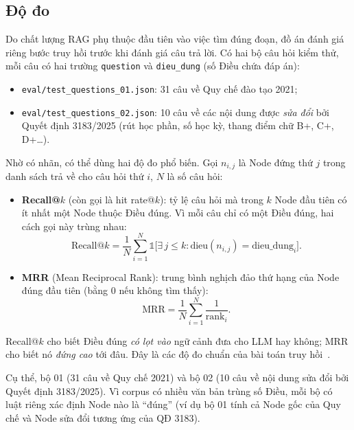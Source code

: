 \subsection{Độ đo}

Do chất lượng RAG phụ thuộc đầu tiên vào việc tìm đúng đoạn, đồ án đánh giá riêng bước truy hồi trước khi đánh giá câu trả lời. Có hai bộ câu hỏi kiểm thử, mỗi câu có hai trường \texttt{question} và \texttt{dieu\_dung} (số Điều chứa đáp án):

\begin{itemize}
  \item \texttt{eval/test\_questions\_01.json}: 31 câu về Quy chế đào tạo 2021;
  \item \texttt{eval/test\_questions\_02.json}: 10 câu về các nội dung được \emph{sửa đổi} bởi Quyết định 3183/2025 (rút học phần, số học kỳ, thang điểm chữ B+, C+, D+\ldots).
\end{itemize}

Nhờ có nhãn, có thể dùng hai độ đo phổ biến. Gọi $n_{i,j}$ là Node đứng thứ $j$ trong danh sách trả về cho câu hỏi thứ $i$, $N$ là số câu hỏi:

\begin{itemize}
  \item \textbf{Recall@$k$} (còn gọi là hit rate@$k$): tỷ lệ câu hỏi mà trong $k$ Node đầu tiên có ít nhất một Node thuộc Điều đúng. Vì mỗi câu chỉ có một Điều đúng, hai cách gọi này trùng nhau:
  \begin{equation}
    \text{Recall@}k = \frac{1}{N}\sum_{i=1}^{N} \mathbb{1}\big[\exists\, j \le k : \text{dieu}(n_{i,j}) = \text{dieu\_dung}_i\big].
  \end{equation}
  \item \textbf{MRR} (Mean Reciprocal Rank): trung bình nghịch đảo thứ hạng của Node đúng đầu tiên (bằng 0 nếu không tìm thấy):
  \begin{equation}
    \text{MRR} = \frac{1}{N}\sum_{i=1}^{N} \frac{1}{\text{rank}_i}.
  \end{equation}
\end{itemize}

Recall@$k$ cho biết Điều đúng \emph{có lọt vào} ngữ cảnh đưa cho LLM hay không; MRR cho biết nó \emph{đứng cao} tới đâu. Đây là các độ đo chuẩn của bài toán truy hồi~\cite{thakur2021beir}.

Cụ thể, bộ 01 (31 câu về Quy chế 2021) và bộ 02
(10 câu về nội dung sửa đổi bởi Quyết định 3183/2025). Vì corpus có nhiều văn bản trùng số Điều, mỗi
bộ có luật riêng xác định Node nào là ``đúng'' (ví dụ bộ 01 tính cả Node gốc của Quy chế và Node sửa
đổi tương ứng của QĐ 3183).

